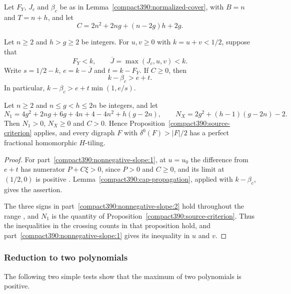 \begin{lemma}
\label{compact390:nonnegative-slope}\label{compact390:ratio-counts}
Let $F_Y$, $J_c$ and $\beta_c$ be as in Lemma~\ref{compact390:normalized-cover}, with $B=n$ and $T=n+h$,
and let
\[
 C=2n^2+2ng+(n-2g)h+2g.
\]
\begin{props}
\item\label{compact390:nonnegative-slope:1} Let $n\ge2$ and $h>g\ge2$ be integers.
For $u,v\ge0$ with $k=u+v<1/2$, suppose that
\[
 F_Y<k,\qquad \overline J=\max(J_c,u,v)<k.
\]
Write $s=1/2-k$, $e=k-\overline J$ and $t=k-F_Y$.
If $C\ge0$, then
\[
                         k-\beta_c>e+t.
\]
In particular, $k-\beta_c>e+t\min(1,e/s)$.
\item\label{compact390:nonnegative-slope:2} Let $n\ge2$ and $n\le g<h\le2n$ be integers, and let
\[
 N_1=4g^2+2ng+6g+4n+4-4n^2+h(g-2n),
 \qquad N_X=2g^2+(h-1)(g-2n)-2.
\]
Then $N_1>0$, $N_X\ge0$ and $C>0$. Hence Proposition~\ref{compact390:source-criterion} applies, and every digraph $F$ with $\delta^0(F)>|F|/2$ has a perfect fractional homomorphic $H$-tiling.
\end{props}
\end{lemma}
\begin{proof}
For part~\ref{compact390:nonnegative-slope:1}, at $u=u_0$ the difference from $e+t$ has numerator
$P+C\xi>0$, since $P>0$ and $C\ge0$, and its limit at $(1/2,0)$ is
positive . Lemma~\ref{compact390:cap-propagation}, applied with
$k-\beta_c$, gives the assertion.

The three signs in part~\ref{compact390:nonnegative-slope:2} hold
throughout the range , and $N_1$ is the quantity of
Proposition~\ref{compact390:source-criterion}. Thus the inequalities in the crossing counts
in that proposition hold, and part~\ref{compact390:nonnegative-slope:1} gives
its inequality in $u$ and $v$.
\end{proof}

\subsubsection{Reduction to two polynomials}

The following two simple tests show that the maximum of two polynomials is positive.

